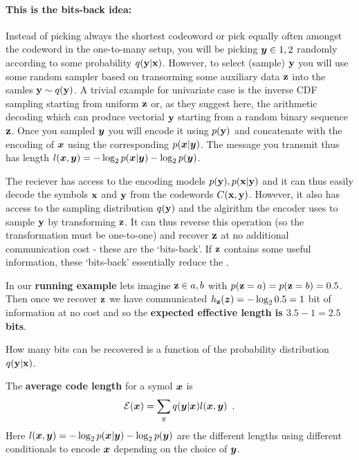 \begin{notebox}
\paragraph{This is the bits-back idea:}
Instead of picking always the shortest codeoword or pick equally often amongst the codeword in the one-to-many setup, you will be picking ${\bm{y}} \in {1, 2}$ randomly according to some probability $q({\mathbf{y}} | {\mathbf{x}})$.
However, to select (sample) ${\mathbf{y}}$ you will use some random sampler based on transorming some auxiliary data ${\mathbf{z}}$ into the samles ${\mathbf{y}} \sim q({\mathbf{y}})$.
A trivial example for univariate case is the inverse CDF sampling starting from uniform ${\mathbf{z}}$ or, as they suggest here, the arithmetic decoding which can produce vectorial ${\mathbf{y}}$ starting from a random binary sequence ${\mathbf{z}}$.
Once you sampled ${\bm{y}}$ you will encode it using $p({\mathbf{y}})$ and concatenate with the encoding of ${\bm{x}}$ using the corresponding $p({\bm{x}} | {\bm{y}})$.
The message you transmit thus has length $l({\bm{x}}, {\bm{y}}) = - \log_2 p({\bm{x}} | {\bm{y}}) - \log_2 p({\bm{y}})$.

The reciever has access to the encoding models $p({\mathbf{y}}), p({\mathbf{x}} | {\mathbf{y}})$ and it 
can thus easily decode the symbols ${\mathbf{x}}$ and ${\mathbf{y}}$ from the codewords $C({\mathbf{x}}, {\mathbf{y}})$.
However, it also has access to the sampling distribution $q({\mathbf{y}})$ and the algirithm the encoder uses to sample ${\mathbf{y}}$ by transforming ${\mathbf{z}}$.
It can thus reverse this operation (so the transformation must be one-to-one) and recover ${\mathbf{z}}$ at no additional communication cost - these are the `bits-back'.
If ${\mathbf{z}}$ contains some useful information, these `bits-back' essentially reduce the .
\end{notebox}

In our \textbf{running example} lets imagine ${\mathbf{z}} \in {a, b}$ with $p({\mathbf{z}}=a)=p({\mathbf{z}}=b)=0.5$.
Then once we recover ${\mathbf{z}}$ we have communicated $h_{{\mathbf{z}}}({\bm{z}}) = - \log_2 0.5 = 1$ bit of information at no cost and so the \textbf{expected effective length is $3.5 - 1 = 2.5$ bits}.

How many bits can be recovered is a function of the probability distribution $q({\mathbf{y}} | {\mathbf{x}})$.

The \textbf{average code length} for a symol ${\bm{x}}$ is
\begin{align}
\mathcal{E}({\bm{x}}) = \sum_y q({\bm{y}} | {\bm{x}}) l({\bm{x}}, {\bm{y}}) \enspace .
\end{align}
Here $l({\bm{x}}, {\bm{y}}) = - \log_2 p({\bm{x}} | {\bm{y}}) - \log_2 p({\bm{y}})$ are the different lengths using different conditionals to encode ${\bm{x}}$ depending on the choice of ${\bm{y}}$.


